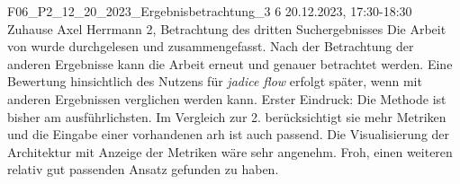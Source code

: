 \fieldnote
{F06\_P2\_12\_20\_2023\_Ergebnisbetrachtung\_3}
{6}
{20.12.2023, 17:30-18:30}
{Zuhause}
{Axel Herrmann}
{2, Betrachtung des dritten Suchergebnisses}
{
	Die Arbeit von  wurde durchgelesen und zusammengefasst.
}
{
	Nach der Betrachtung der anderen Ergebnisse kann die Arbeit erneut und genauer betrachtet werden.
	Eine Bewertung hinsichtlich des Nutzens für \emph{jadice flow} erfolgt später, wenn mit anderen Ergebnissen verglichen werden kann.
}
{
  Erster Eindruck: Die Methode ist bisher am ausführlichsten.
  Im Vergleich zur 2. berücksichtigt sie mehr Metriken und die Eingabe einer vorhandenen \gls{arh} ist auch passend.
  Die Visualisierung der Architektur mit Anzeige der Metriken wäre sehr angenehm.
}
{}
{
  Froh, einen weiteren relativ gut passenden Ansatz gefunden zu haben.
}
